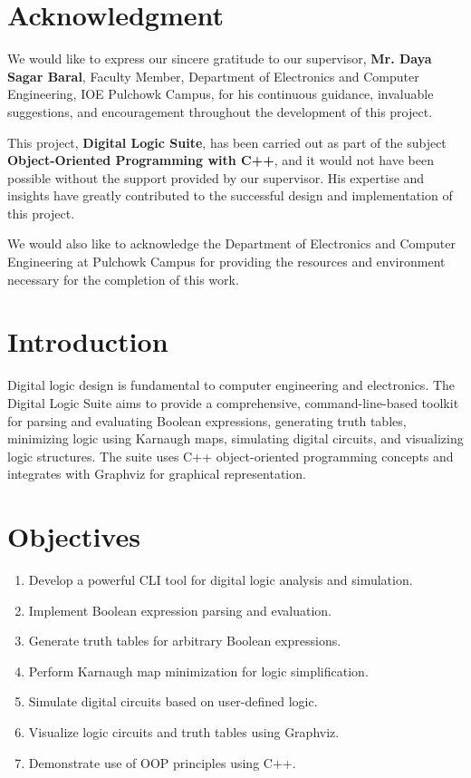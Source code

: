 \documentclass[a4paper,12pt]{article}
\begin{document}
\clearpage

\section*{Acknowledgment}

We would like to express our sincere gratitude to our supervisor, \textbf{Mr. Daya Sagar Baral}, Faculty Member, Department of Electronics and Computer Engineering, IOE Pulchowk Campus, for his continuous guidance, invaluable suggestions, and encouragement throughout the development of this project.

This project, \textbf{Digital Logic Suite}, has been carried out as part of the subject \textbf{Object-Oriented Programming with C++}, and it would not have been possible without the support provided by our supervisor. His expertise and insights have greatly contributed to the successful design and implementation of this project.

We would also like to acknowledge the Department of Electronics and Computer Engineering at Pulchowk Campus for providing the resources and environment necessary for the completion of this work.

\newpage

\tableofcontents
\newpage

\section{Introduction}
Digital logic design is fundamental to computer engineering and electronics. The Digital Logic Suite aims to provide a comprehensive, command-line-based toolkit for parsing and evaluating Boolean expressions, generating truth tables, minimizing logic using Karnaugh maps, simulating digital circuits, and visualizing logic structures. The suite uses C++ object-oriented programming concepts and integrates with Graphviz for graphical representation.

\section{Objectives}
\renewcommand{\labelenumi}{\roman{enumi}.}
\begin{enumerate}
    \item Develop a powerful CLI tool for digital logic analysis and simulation.
    \item Implement Boolean expression parsing and evaluation.
    \item Generate truth tables for arbitrary Boolean expressions.
    \item Perform Karnaugh map minimization for logic simplification.
    \item Simulate digital circuits based on user-defined logic.
    \item Visualize logic circuits and truth tables using Graphviz.
    \item Demonstrate use of OOP principles using C++.
\end{enumerate}
\end{document}
